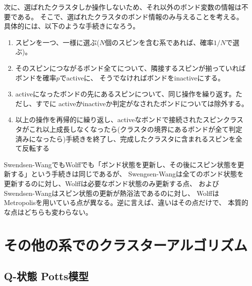 \documentclass{jarticle}
\begin{document}
次に、選ばれたクラスタしか操作しないため、それ以外のボンド変数の情報は不要である。
そこで、選ばれたクラスタのボンド情報のみ与えることを考える。
具体的には、以下のような手続きになろう。
\begin{enumerate}
  \item スピンを一つ、一様に選ぶ($N$個のスピンを含む系であれば、確率$1/N$で選ぶ)。
  \item そのスピンにつながるボンド全てについて、隣接するスピンが揃っていればボンドを確率$p$でactiveに、
        そうでなければボンドをinactiveにする。
  \item activeになったボンドの先にあるスピンについて、同じ操作を繰り返す。ただし、すでに
        activeかinactiveか判定がなされたボンドについては除外する。
  \item 以上の操作を再帰的に繰り返し、activeなボンドで接続されたスピンクラスタがこれ以上成長しなくなったら(クラスタの境界にあるボンドが全て判定済みになったら)手続きを終了し、完成したクラスタに含まれるスピンを全て反転する
\end{enumerate}
Swendsen-WangでもWolffでも「ボンド状態を更新し、その後にスピン状態を更新する」という手続きは同じであるが、
Swengsen-Wangは全てのボンド状態を更新するのに対し、Wolffは必要なボンド状態のみ更新する点、
およびSwendsen-Wangはスピン状態の更新が熱浴法であるのに対し、
WolffはMetropolisを用いている点が異なる。逆に言えば、違いはその点だけで、
本質的な点はどちらも変わらない。

\section{その他の系でのクラスターアルゴリズム}

\subsection{Q-状態 Potts模型}
\end{document}
